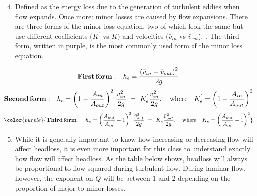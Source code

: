 \documentclass[letterpaper,10pt,english]{sphinxmanual}
\begin{document}
\begin{enumerate}
\setcounter{enumi}{3}
\item {} 
 Defined as the energy loss due to the generation of turbulent eddies when flow expands. Once more: minor losses are caused by flow expansions. There are three forms of the minor loss equation, two of which look the same but use different coefficients (\(K^{'}\) vs \(K\)) and velocities (\(\bar v_{in}\) vs \(\bar v_{out}\)). . The third form, written in purple, is the most commonly used form of the minor loss equation.

\end{enumerate}
\begin{equation}\label{equation:Fluids_Review/Fluids_Review_Design:Fluids_Review/Fluids_Review_Design:45}
\begin{split}{\rm{ \mathbf{First \, form:} }} \quad h_e = \frac{\left( \bar v_{in}  - \bar v_{out} \right)^2}{2g}\end{split}
\end{equation}\begin{equation}\label{equation:Fluids_Review/Fluids_Review_Design:Fluids_Review/Fluids_Review_Design:46}
\begin{split}{\rm{ \mathbf{Second \, form:} }} \quad h_e = \left( 1 - \frac{A_{in}}{A_{out}} \right)^2 \, \frac{\bar v_{in}^2}{2g} \, \, = \, \, K_e^{'} \frac{\bar v_{in}^2}{2g}, \quad {\rm where} \quad K_e^{'} = \left( 1 - \frac{A_{in}}{A_{out}} \right)^2\end{split}
\end{equation}\begin{equation}\label{equation:Fluids_Review/Fluids_Review_Design:Fluids_Review/Fluids_Review_Design:47}
\begin{split}\color{purple}{
{\rm{ \mathbf{Third \, form:} }} \quad h_e = \left( \frac{A_{out}}{A_{in}} -1 \right)^2 \, \frac{\bar  v_{out}^2}{2g} \, \, = \, \, K_e \frac{\bar v_{out}^2}{2g}, \quad {\rm where} \quad K_e = \left( \frac{A_{out}}{A_{in}} - 1 \right)^2
}\end{split}
\end{equation}\begin{enumerate}
\setcounter{enumi}{4}
\item {} 
 While it is generally important to know how increasing or decreasing flow will affect headloss, it is even more important for this class to understand exactly how flow will affect headloss. As the table below shows, headloss will always be proportional to flow squared during turbulent flow. During laminar flow, however, the exponent on \(Q\) will be between 1 and 2 depending on the proportion of major to minor losses.

\end{enumerate}
\end{document}
